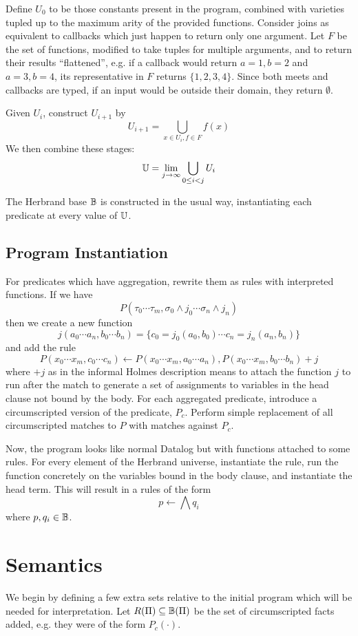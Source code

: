 Define $U_0$ to be those constants present in the program, combined with varieties tupled up to the maximum arity of the provided functions.
Consider joins as equivalent to callbacks which just happen to return only one argument.
Let $F$ be the set of functions, modified to take tuples for multiple arguments, and to return their results ``flattened'', e.g. if a callback would return $a = 1, b = 2$ and $a = 3, b = 4$, its representative in $F$ returns $\{1, 2, 3, 4\}$.
Since both meets and callbacks are typed, if an input would be outside their domain, they return $\emptyset$.

Given $U_i$, construct $U_{i + 1}$ by
\[
	U_{i + 1} = \bigcup_{x \in U_i, f \in F} f(x)
\]
We then combine these stages:
\[
	\mathbb{U} = \lim_{j \rightarrow \infty} \bigcup_{0 \leq i < j} U_i
\]

The Herbrand base $\mathbb{B}$ is constructed in the usual way, instantiating each predicate at every value of $\mathbb{U}$.

\subsection{Program Instantiation}
For predicates which have aggregation, rewrite them as rules with interpreted functions.
If we have
\[
	P(\tau_0 \cdots \tau_m, \sigma_0\wedge j_0 \cdots \sigma_n \wedge j_n)
\]
then we create a new function
\[
	j(a_0 \cdots a_n, b_0 \cdots b_n) = \{c_0 = j_0(a_0, b_0) \cdots c_n = j_n(a_n, b_n)\}
\]
and add the rule
\[
	P(x_0 \cdots x_m, c_0 \cdots c_n) \leftarrow P(x_0 \cdots x_m, a_0 \cdots a_n), P(x_0 \cdots x_m, b_0 \cdots b_n) + j
\]
where $+ j$ as in the informal Holmes description means to attach the function $j$ to run after the match to generate a set of assignments to variables in the head clause not bound by the body.
For each aggregated predicate, introduce a circumscripted version of the predicate, $P_c$.
Perform simple replacement of all circumscripted matches to $P$ with matches against $P_c$.

Now, the program looks like normal Datalog but with functions attached to some rules.
For every element of the Herbrand universe, instantiate the rule, run the function concretely on the variables bound in the body clause, and instantiate the head term.
This will result in a rules of the form
\[
	p \leftarrow \bigwedge q_i
\]
where $p, q_i \in \mathbb{B}$.

\section{Semantics}
\label{formal:sec:semantics}
We begin by defining a few extra sets relative to the initial program which will be needed for interpretation.
Let $R(\Pi) \subseteq \mathbb{B}(\Pi)$ be the set of circumscripted facts added, e.g. they were of the form $P_c(\cdot)$.

